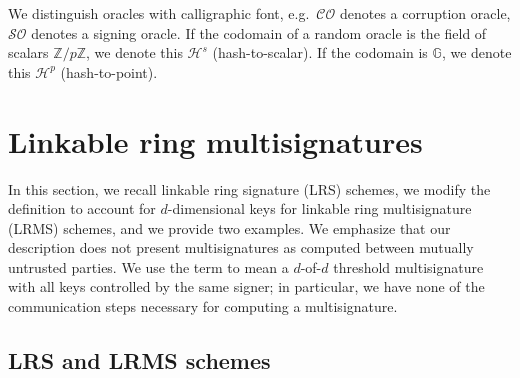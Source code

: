 \documentclass{article}
\theoremstyle{plain}
\theoremstyle{definition}
\begin{document}
We distinguish oracles with calligraphic font, e.g.\ $\mathcal{CO}$ denotes a corruption oracle, $\mathcal{SO}$ denotes a signing oracle. If the codomain of a random oracle is the field of scalars $\mathbb{Z}/p\mathbb{Z}$, we denote this $\mathcal{H}^s$ (hash-to-scalar). If the codomain is $\mathbb{G}$, we denote this $\mathcal{H}^p$ (hash-to-point).


\section{Linkable ring multisignatures}

In this section, we recall linkable ring signature (LRS) schemes, we modify the definition to account for $d$-dimensional keys for linkable ring multisignature (LRMS) schemes, and we provide two examples. We emphasize that our description does not present multisignatures as computed between mutually untrusted parties. We use the term to mean a $d$-of-$d$ threshold multisignature with all keys controlled by the same signer; in particular, we have none of the communication steps necessary for computing a multisignature.


\subsection{LRS and LRMS schemes}
\end{document}
